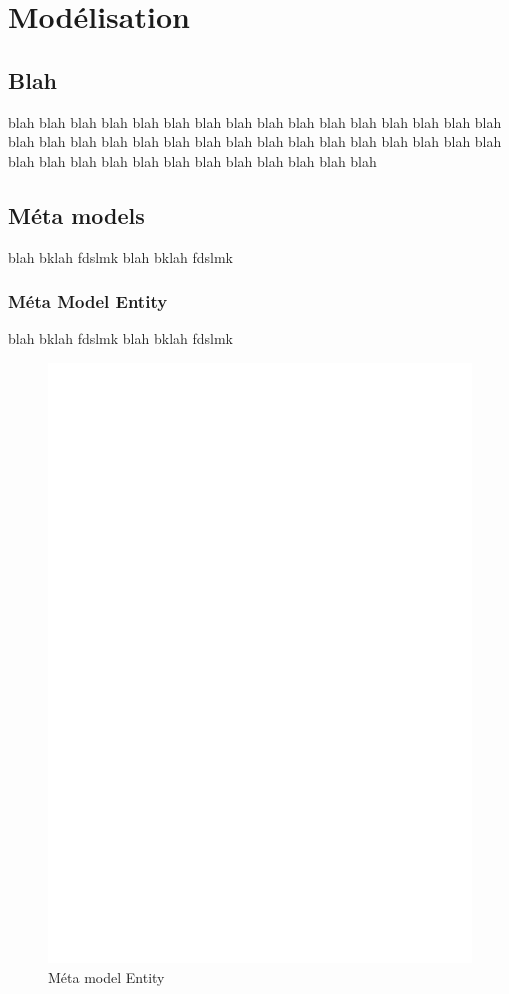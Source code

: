 

\chapter{Modélisation}\label{chap:mod}
\section{Blah}
blah blah blah blah blah blah blah blah blah blah blah blah blah blah blah blah blah blah 
blah blah blah blah blah blah blah blah blah blah blah blah blah blah blah blah blah blah blah blah blah blah blah blah blah blah 
\section{Méta models}\label{sec:met}
blah bklah fdslmk blah bklah fdslmk 

\subsection{Méta Model Entity}\label{sub:ent}
blah bklah fdslmk blah bklah fdslmk 
\begin{figure}[htb]
  \centering
  \includegraphics[scale=.3]{img/Entity.eps}
  \caption{Méta model Entity}
  \label{fig:ent}
\end{figure}

